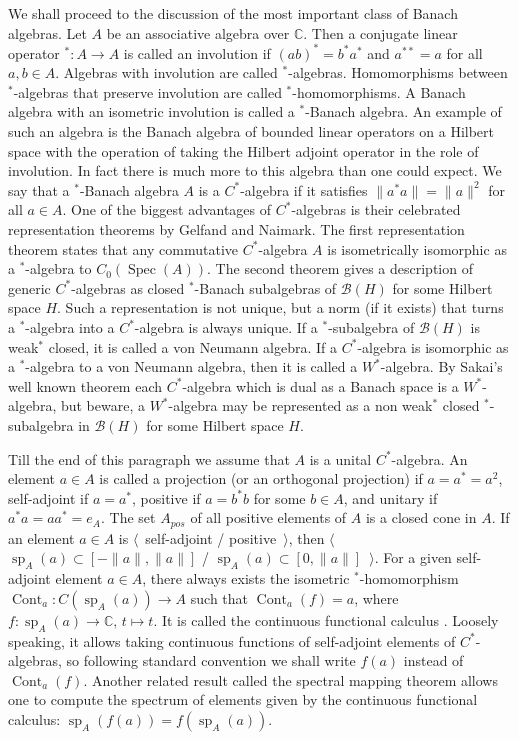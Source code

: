 We shall proceed to the discussion of the most important class of Banach
algebras. Let $A$ be an associative algebra over $\mathbb{C}$. Then a conjugate
linear operator ${}^*:A\to A$ is called an involution if ${(ab)}^*=b^*a^*$ and
$a^{**}=a$ for all $a,b\in A$. Algebras with involution are called
${}^*$-algebras. Homomorphisms between ${}^*$-algebras that preserve involution
are called ${}^*$-homomorphisms. A Banach algebra with an isometric involution is
called a ${}^*$-Banach algebra. An example of such an algebra is the Banach algebra
of bounded linear operators on a Hilbert space with the operation of taking the
Hilbert adjoint operator in the role of involution. In fact there is much more
to this algebra than one could expect. We say that a ${}^*$-Banach algebra $A$
is a $C^*$-algebra if it satisfies $\lVert a^*a\rVert=\lVert a\rVert^2$ for all
$a\in A$. One of the biggest advantages of $C^*$-algebras is their celebrated
representation theorems by Gelfand and Naimark. The first representation theorem
\cite[theorem 4.7.13]{HelBanLocConvAlg} states that any commutative
$C^*$-algebra $A$ is isometrically isomorphic as a ${}^*$-algebra to
$C_0(\operatorname{Spec}(A))$. The second theorem \cite[theorem 4.7.57]{HelBanLocConvAlg} gives a description of generic $C^*$-algebras as closed
${}^*$-Banach subalgebras of $\mathcal{B}(H)$ for some Hilbert space $H$. Such
a representation is not unique, but a norm (if it exists) that turns a
${}^*$-algebra into a $C^*$-algebra is always unique. If a ${}^*$-subalgebra of
$\mathcal{B}(H)$ is weak${}^*$ closed, it is called a von Neumann algebra. If a
$C^*$-algebra is isomorphic as a ${}^*$-algebra to a von Neumann algebra, then it is
called a $W^*$-algebra. By Sakai's well known theorem \cite[theorem III.2.4.2]{BlackadarOpAlg} each $C^*$-algebra which is dual as a Banach space is a
$W^*$-algebra, but beware, a $W^*$-algebra may be represented as a non weak${}^*$
closed ${}^*$-subalgebra in $\mathcal{B}(H)$ for some Hilbert space $H$. 

Till the end of this paragraph we assume that $A$ is a unital $C^*$-algebra. 
An element $a\in A$ is called a projection (or an orthogonal projection) 
if $a=a^*=a^2$, self-adjoint if $a=a^*$, positive if $a=b^*b$ for 
some $b\in A$, and unitary if $a^*a=aa^*=e_A$. The set $A_{pos}$ of all positive 
elements of $A$ is a closed cone in $A$. If an element $a\in A$ 
is $\langle$~self-adjoint / positive~$\rangle$, then
$\langle$~$\operatorname{sp}_A(a)\subset[-\lVert a\rVert, \lVert a\rVert]$ /
$\operatorname{sp}_A(a)\subset[0,\lVert a\rVert]$~$\rangle$. For a given
self-adjoint element $a\in A$, there always exists the isometric
${}^*$-homomorphism $\operatorname{Cont}_a:C(\operatorname{sp}_A(a))\to A$ such
that $\operatorname{Cont}_a(f)=a$, where
$f:\operatorname{sp}_A(a)\to\mathbb{C},\, t\mapsto t$. It is called the continuous
functional calculus \cite[theorem 4.7.24]{HelBanLocConvAlg}. Loosely speaking,
it allows taking continuous functions of self-adjoint elements of
$C^*$-algebras, so following standard convention we shall write $f(a)$ instead
of $\operatorname{Cont}_a(f)$. Another related result called the spectral
mapping theorem allows one to compute the spectrum of elements given by the continuous
functional calculus: $\operatorname{sp}_A(f(a))=f(\operatorname{sp}_A(a))$.


